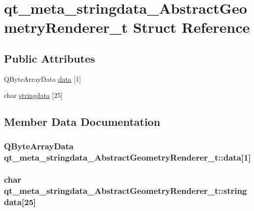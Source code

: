 \hypertarget{structqt__meta__stringdata___abstract_geometry_renderer__t}{\section{qt\+\_\+meta\+\_\+stringdata\+\_\+\+Abstract\+Geometry\+Renderer\+\_\+t Struct Reference}
\label{structqt__meta__stringdata___abstract_geometry_renderer__t}
}
\subsection*{Public Attributes}
\begin{DoxyCompactItemize}
\item 
Q\+Byte\+Array\+Data \hyperlink{structqt__meta__stringdata___abstract_geometry_renderer__t_af06f65bf4e6b2816b88a6f787434a646}{data} \mbox{[}1\mbox{]}
\item 
char \hyperlink{structqt__meta__stringdata___abstract_geometry_renderer__t_a1a06c9786d41917868142ae76dffb63e}{stringdata} \mbox{[}25\mbox{]}
\end{DoxyCompactItemize}


\subsection{Member Data Documentation}
\hypertarget{structqt__meta__stringdata___abstract_geometry_renderer__t_af06f65bf4e6b2816b88a6f787434a646}{
\subsubsection[{data}]{\setlength{\rightskip}{0pt plus 5cm}Q\+Byte\+Array\+Data qt\+\_\+meta\+\_\+stringdata\+\_\+\+Abstract\+Geometry\+Renderer\+\_\+t\+::data\mbox{[}1\mbox{]}}}\label{structqt__meta__stringdata___abstract_geometry_renderer__t_af06f65bf4e6b2816b88a6f787434a646}
\hypertarget{structqt__meta__stringdata___abstract_geometry_renderer__t_a1a06c9786d41917868142ae76dffb63e}{
\subsubsection[{stringdata}]{\setlength{\rightskip}{0pt plus 5cm}char qt\+\_\+meta\+\_\+stringdata\+\_\+\+Abstract\+Geometry\+Renderer\+\_\+t\+::stringdata\mbox{[}25\mbox{]}}}\label{structqt__meta__stringdata___abstract_geometry_renderer__t_a1a06c9786d41917868142ae76dffb63e}



